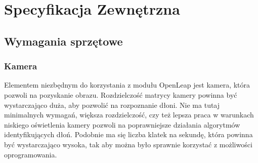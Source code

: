 

\chapter{Specyfikacja Zewnętrzna}



\section{Wymagania sprzętowe}
\subsection{Kamera}
\quad Elementem niezbędnym do korzystania z modułu OpenLeap jest kamera, która pozwoli na pozyskanie obrazu. Rozdzielczość matrycy kamery powinna być wystarczająco duża, aby pozwolić na rozpoznanie dłoni. Nie ma tutaj minimalnych wymagań, większa rozdzielczość, czy też lepsza praca w warunkach niskiego oświetlenia kamery pozwoli na poprawniejsze działania algorytmów identyfikujących dłoń. Podobnie ma się liczba klatek na sekundę, która powinna być wystarczająco wysoka, tak aby można było sprawnie korzystać z możliwości oprogramowania. 

